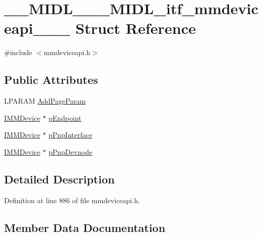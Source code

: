 \hypertarget{struct_____m_i_d_l_______m_i_d_l__itf__mmdeviceapi__0000__0006__0001}{}\section{\+\_\+\+\_\+\+M\+I\+D\+L\+\_\+\+\_\+\+\_\+\+M\+I\+D\+L\+\_\+itf\+\_\+mmdeviceapi\+\_\+\_\+\_ Struct Reference}
\label{struct_____m_i_d_l_______m_i_d_l__itf__mmdeviceapi__0000__0006__0001}


{\ttfamily \#include $<$mmdeviceapi.\+h$>$}

\subsection*{Public Attributes}
\begin{DoxyCompactItemize}
\item 
L\+P\+A\+R\+AM \hyperlink{struct_____m_i_d_l_______m_i_d_l__itf__mmdeviceapi__0000__0006__0001_ac865f5d01499f62768d6e72c838c511b}{Add\+Page\+Param}
\item 
\hyperlink{mmdeviceapi_8h_a8d4cacf41e022eb8b6aed6231bcf54be}{I\+M\+M\+Device} $\ast$ \hyperlink{struct_____m_i_d_l_______m_i_d_l__itf__mmdeviceapi__0000__0006__0001_a4089b2075102ec7e40c490d9e032dfaf}{p\+Endpoint}
\item 
\hyperlink{mmdeviceapi_8h_a8d4cacf41e022eb8b6aed6231bcf54be}{I\+M\+M\+Device} $\ast$ \hyperlink{struct_____m_i_d_l_______m_i_d_l__itf__mmdeviceapi__0000__0006__0001_a109d271e4b6c50f7e7cde94575bebfa4}{p\+Pnp\+Interface}
\item 
\hyperlink{mmdeviceapi_8h_a8d4cacf41e022eb8b6aed6231bcf54be}{I\+M\+M\+Device} $\ast$ \hyperlink{struct_____m_i_d_l_______m_i_d_l__itf__mmdeviceapi__0000__0006__0001_a3b08c793f399e0cd2fea9321adf500c6}{p\+Pnp\+Devnode}
\end{DoxyCompactItemize}


\subsection{Detailed Description}


Definition at line 886 of file mmdeviceapi.\+h.



\subsection{Member Data Documentation}
